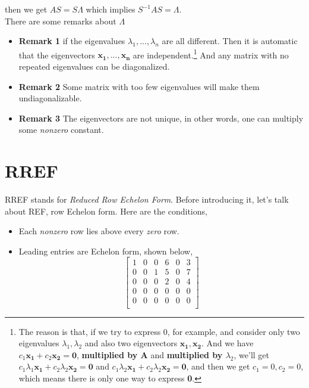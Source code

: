 \documentclass[12pt]{article}
\begin{document}
then we get $AS = S\Lambda$ which implies $S^{-1}AS = \Lambda$.
\\
There are some remarks about $\Lambda$

\begin{itemize}
    \item \textbf{Remark 1} if the eigenvalues $\lambda_1, ..., \lambda_n$ are all different. Then it is automatic that the eigenvectors $\mathbf{x_1, ..., x_n}$ are independent.\footnote{The reason is that, if we try to express 0, for example, and consider only two eigenvalues $\lambda_1, \lambda_2$ and also two eigenvectors $\mathbf{x_1, x_2}$. And we have $c_1\mathbf{x_1}+c_2\mathbf{x_2} = \mathbf{0}$, \textbf{multiplied by A} and \textbf{multiplied by $\lambda_2$}, we'll get $c_1\lambda_1\mathbf{x_1} + c_2\lambda_2\mathbf{x_2} = \mathbf{0}$ and $c_1\lambda_2\mathbf{x_1} + c_2\lambda_2\mathbf{x_2} = \mathbf{0}$, and then we get $c_1 = 0, c_2 = 0$, which means there is only one way to express \textbf{0}.} And any matrix with no repeated eigenvalues can be diagonalized.
    \item \textbf{Remark 2} Some matrix with too few eigenvalues will make them undiagonalizable.
    \item \textbf{Remark 3} The eigenvectors are not unique, in other words, one can multiply some \textit{nonzero} constant.
\end{itemize}

\section{RREF}

RREF stands for \textit{Reduced Row Echelon Form}. Before introducing it, let's talk  about REF, row Echelon form. Here are the conditions,

\begin{itemize}
    \item Each \textit{nonzero} row lies above every \textit{zero} row.
    \item Leading entries are Echelon form, shown below, \[ \begin{bmatrix}
        1&0&0&6&0&3\\
        0&0&1&5&0&7\\
        0&0&0&2&0&4\\
        0&0&0&0&0&0\\
        0&0&0&0&0&0\\
    \end{bmatrix}\]
\end{itemize}
\end{document}
